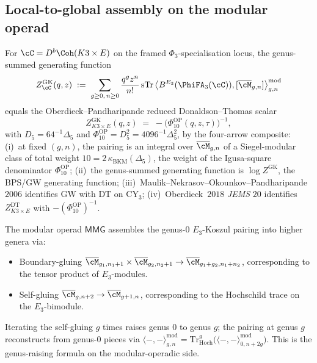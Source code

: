 \subsection{Local-to-global assembly on the modular operad}

\begin{conjecture}
\label{prop:gk-partition-bkm-chapter}
\ClaimStatusConjectured
For $\cC = D^b\Coh(K3 \times E)$ on the framed $\Phi_3$-specialisation
locus, the genus-summed generating function
\begin{equation}
\label{eq:gk-partition-chapter}
 Z^{\mathrm{GK}}_\cC(q, z) \;:=\; \sum_{g \geq 0,\, n \geq 0}
 \frac{q^g z^n}{n!}\,
 \mathrm{sTr}\,\bigl\langle B^{E_3}(\PhiFA_3(\cC)),
 [\overline{\cM}_{g, n}]\bigr\rangle^{\mathrm{mod}}_{g, n}
\end{equation}
equals the Oberdieck--Pandharipande reduced Donaldson--Thomas scalar
\[
 Z^{\mathrm{GK}}_{K3 \times E}(q, z) \;=\;
 -\bigl(\Phi_{10}^{\mathrm{OP}}(q, z, \tau)\bigr)^{-1},
\]
with $D_5=64^{-1}\Delta_5$ and
$\Phi_{10}^{\mathrm{OP}}=D_5^2=4096^{-1}\Delta_5^2$, by
the four-arrow composite: (i)~at fixed $(g, n)$, the pairing is an
integral over $\overline{\cM}_{g, n}$ of a Siegel-modular class of
total weight \(10=2\,\kappa_{\mathrm{BKM}}(\Delta_5)\), the weight of
the Igusa-square denominator \(\Phi_{10}^{\mathrm{OP}}\); (ii)~the genus-summed
generating function is $\log Z^{\mathrm{GK}}$, the BPS/GW generating
function; (iii)~Maulik--Nekrasov--Okounkov--Pandharipande~$2006$
identifies GW with DT on CY$_3$; (iv)~Oberdieck~$2018$
\emph{JEMS} $20$ identifies $Z^{\mathrm{DT}}_{K3 \times E}$ with
$-(\Phi_{10}^{\mathrm{OP}})^{-1}$.
\end{conjecture}

\begin{remark}
\label{rem:gk-local-to-global}
The modular operad $\mathsf{MMG}$ assembles the genus-$0$ $E_3$-Koszul
pairing into higher genera via:
\begin{itemize}
 \item Boundary-gluing $\overline{\cM}_{g_1, n_1 + 1} \times
 \overline{\cM}_{g_2, n_2 + 1} \to \overline{\cM}_{g_1 + g_2, n_1 + n_2}$,
 corresponding to the tensor product of $E_3$-modules.
 \item Self-gluing $\overline{\cM}_{g, n + 2} \to \overline{\cM}_{g + 1, n}$,
 corresponding to the Hochschild trace on the $E_3$-bimodule.
\end{itemize}
Iterating the self-gluing $g$ times raises genus $0$ to genus $g$; the
pairing at genus $g$ reconstructs from genus-$0$ pieces via
$\langle -, - \rangle^{\mathrm{mod}}_{g, n} =
\mathrm{Tr}^g_{\mathrm{Hoch}}
\bigl(\langle -, - \rangle^{\mathrm{mod}}_{0, n + 2g}\bigr)$. This is
the genus-raising formula on the modular-operadic side.
\end{remark}

